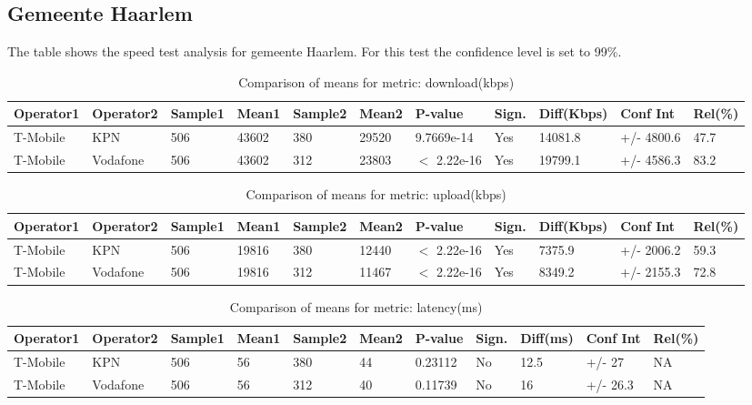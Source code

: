 \documentclass[]{article}
\begin{document}
\normalsize

\newpage

\subsection{Gemeente Haarlem}\label{gemeente-haarlem}

The table shows the speed test analysis for gemeente Haarlem. For this
test the confidence level is set to 99\%.

\begin{table}[ht]
\centering
{\footnotesize
\begin{tabular}{lllllllllll}
  \hline
Operator1 & Operator2 & Sample1 & Mean1 & Sample2 & Mean2 & P-value & Sign. & Diff(Kbps) & Conf Int & Rel(\%) \\ 
  \hline
T-Mobile & KPN & 506 & 43602 & 380 & 29520 & 9.7669e-14 & Yes & 14081.8 & +/- 4800.6 & 47.7 \\ 
  T-Mobile & Vodafone & 506 & 43602 & 312 & 23803 & $<$ 2.22e-16 & Yes & 19799.1 & +/- 4586.3 & 83.2 \\ 
   \hline
\end{tabular}
}
\caption{Comparison of means for metric: download(kbps)} 
\end{table}\begin{table}[ht]
\centering
{\footnotesize
\begin{tabular}{lllllllllll}
  \hline
Operator1 & Operator2 & Sample1 & Mean1 & Sample2 & Mean2 & P-value & Sign. & Diff(Kbps) & Conf Int & Rel(\%) \\ 
  \hline
T-Mobile & KPN & 506 & 19816 & 380 & 12440 & $<$ 2.22e-16 & Yes & 7375.9 & +/- 2006.2 & 59.3 \\ 
  T-Mobile & Vodafone & 506 & 19816 & 312 & 11467 & $<$ 2.22e-16 & Yes & 8349.2 & +/- 2155.3 & 72.8 \\ 
   \hline
\end{tabular}
}
\caption{Comparison of means for metric: upload(kbps)} 
\end{table}\begin{table}[ht]
\centering
{\footnotesize
\begin{tabular}{lllllllllll}
  \hline
Operator1 & Operator2 & Sample1 & Mean1 & Sample2 & Mean2 & P-value & Sign. & Diff(ms) & Conf Int & Rel(\%) \\ 
  \hline
T-Mobile & KPN & 506 & 56 & 380 & 44 & 0.23112 & No & 12.5 & +/- 27 & NA \\ 
  T-Mobile & Vodafone & 506 & 56 & 312 & 40 & 0.11739 & No & 16 & +/- 26.3 & NA \\ 
   \hline
\end{tabular}
}
\caption{Comparison of means for metric: latency(ms)} 
\end{table}
\end{document}
